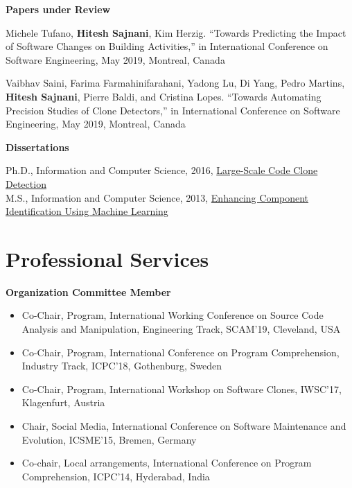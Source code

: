 \documentclass[letterpaper,11pt]{article}
\begin{document}
\textbf{Papers under Review}

\begin{etaremune}

 \item\small{Michele Tufano, \textbf{Hitesh Sajnani}, Kim Herzig. “Towards Predicting the Impact of Software Changes on Building Activities,” in International Conference on Software Engineering, May 2019, Montreal, Canada}
 \item\small{Vaibhav Saini, Farima Farmahinifarahani, Yadong Lu, Di Yang, Pedro Martins, \textbf{Hitesh Sajnani}, Pierre Baldi, and Cristina Lopes. “Towards Automating Precision Studies of Clone Detectors,” in International Conference on Software Engineering, May 2019, Montreal, Canada}

\end{etaremune}

\textbf{Dissertations}
  \vspace{10pt}

 \hspace{10pt} \small{Ph.D., Information and Computer Science, 2016,  \href{https://escholarship.org/uc/item/45r2308g}{Large-Scale Code Clone Detection}} \\
  \vspace{10pt}\hspace{10pt} \small{M.S., Information and Computer Science, 2013,  \href{https://uci.primo.exlibrisgroup.com/discovery/fulldisplay?docid=alma991033254679704701&context=L\&vid=01CDL_IRV_INST:UCI\&search_scope=MyInst_and_CI\&tab=Everything\&lang=en}{Enhancing Component Identification Using Machine Learning}}

\newpage

\section{Professional Services}

\textbf{Organization Committee Member}

\begin{itemize}

  \item\small{Co-Chair, Program, International Working Conference on Source Code Analysis and Manipulation, Engineering Track, SCAM’19, Cleveland, USA }
  \vspace{-5pt}\item\small{Co-Chair, Program, International Conference on Program Comprehension, Industry Track, ICPC’18, Gothenburg, Sweden }
   \vspace{-5pt}\item\small{Co-Chair, Program, International Workshop on Software Clones, IWSC’17, Klagenfurt, Austria }
   \vspace{-5pt}\item\small{Chair, Social Media, International Conference on Software Maintenance and Evolution, ICSME’15, Bremen, Germany }
  \vspace{-5pt}\item\small{Co-chair, Local arrangements, International Conference on Program Comprehension, ICPC’14, Hyderabad, India }
\end{itemize}
\end{document}
